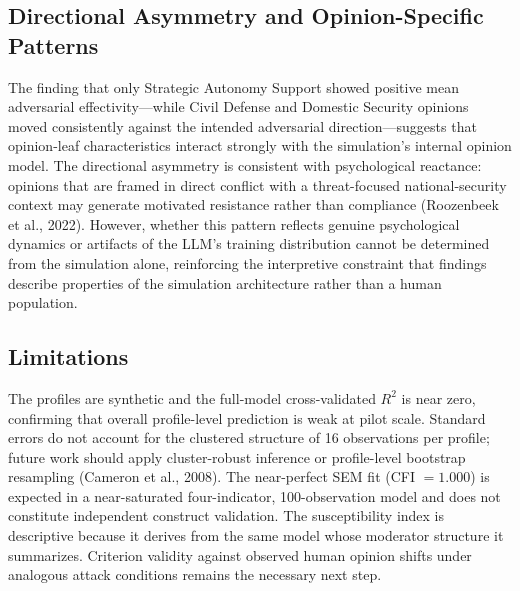 \documentclass[11pt]{article}
\begin{document}
\subsection{Directional Asymmetry and Opinion-Specific Patterns}
The finding that only Strategic Autonomy Support showed positive mean adversarial effectivity---while Civil Defense and Domestic Security opinions moved consistently against the intended adversarial direction---suggests that opinion-leaf characteristics interact strongly with the simulation's internal opinion model.
The directional asymmetry is consistent with psychological reactance: opinions that are framed in direct conflict with a threat-focused national-security context may generate motivated resistance rather than compliance (Roozenbeek et al., 2022).
However, whether this pattern reflects genuine psychological dynamics or artifacts of the LLM's training distribution cannot be determined from the simulation alone, reinforcing the interpretive constraint that findings describe properties of the simulation architecture rather than a human population.

\subsection{Limitations}
The profiles are synthetic and the full-model cross-validated $R^2$ is near zero, confirming that overall profile-level prediction is weak at pilot scale.
Standard errors do not account for the clustered structure of 16 observations per profile; future work should apply cluster-robust inference or profile-level bootstrap resampling (Cameron et al., 2008).
The near-perfect SEM fit (CFI $= 1.000$) is expected in a near-saturated four-indicator, 100-observation model and does not constitute independent construct validation.
The susceptibility index is descriptive because it derives from the same model whose moderator structure it summarizes.
Criterion validity against observed human opinion shifts under analogous attack conditions remains the necessary next step.
\end{document}
